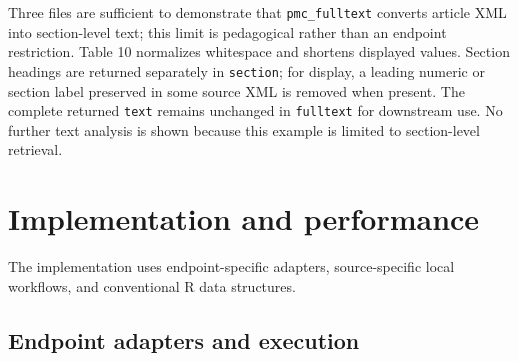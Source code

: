 \begin{table}[!h]
\centering
\caption{\label{tab:pmc-fulltext-table}Representative section text from each retrieved PMC article.}
\centering
{}
\end{table}

Three files are sufficient to demonstrate that \texttt{pmc\_fulltext} converts article
XML into section-level text; this limit is pedagogical rather than an endpoint
restriction. Table 10 normalizes whitespace and shortens displayed values.
Section headings are returned separately in \texttt{section}; for display, a leading
numeric or section label preserved in some source XML is removed when present.
The complete returned \texttt{text} remains unchanged in \texttt{fulltext} for downstream
use. No further text analysis is shown because this example is limited to
section-level retrieval.

\section{Implementation and performance}\label{implementation-and-performance}

The implementation uses endpoint-specific adapters, source-specific local
workflows, and conventional R data structures.

\subsection{Endpoint adapters and execution}\label{endpoint-adapters-and-execution}

